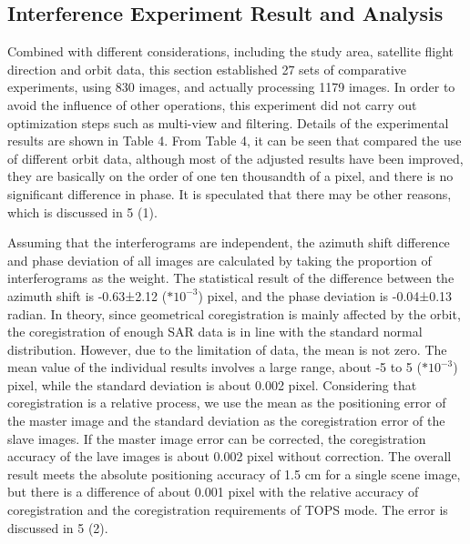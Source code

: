 \documentclass[a4paper,fleqn]{cas-dc}
\begin{document}
\subsection{Interference Experiment Result and Analysis}
Combined with different considerations, including the study area, satellite flight direction and orbit data, this section established 27 sets of comparative experiments, using 830 images, and actually processing 1179 images. In order to avoid the influence of other operations, this experiment did not carry out optimization steps such as multi-view and filtering. Details of the experimental results are shown in Table 4. From Table 4, it can be seen that compared the use of different orbit data, although most of the adjusted results have been improved, they are basically on the order of one ten thousandth of a pixel, and there is no significant difference in phase. It is speculated that there may be other reasons, which is discussed in 5 (1). \par
Assuming that the interferograms are independent, the azimuth shift difference and phase deviation of all images are calculated by taking the proportion of interferograms as the weight. The statistical result of the difference between the azimuth shift is -0.63±2.12 ($*10^{-3}$) pixel, and the phase deviation is -0.04±0.13 radian. In theory, since geometrical coregistration is mainly affected by the orbit, the coregistration of enough SAR data is in line with the standard normal distribution. However, due to the limitation of data, the mean is not zero. The mean value of the individual results involves a large range, about -5 to 5 ($*10^{-3}$) pixel, while the standard deviation is about 0.002 pixel. Considering that coregistration is a relative process, we use the mean as the positioning error of the master image and the standard deviation as the coregistration error of the slave images. If the master image error can be corrected, the coregistration accuracy of the lave images is about 0.002 pixel without correction. The overall result meets the absolute positioning accuracy of 1.5 cm for a single scene image, but there is a difference of about 0.001 pixel with the relative accuracy of coregistration and the coregistration requirements of TOPS mode. The error is discussed in 5 (2). \par
\end{document}
